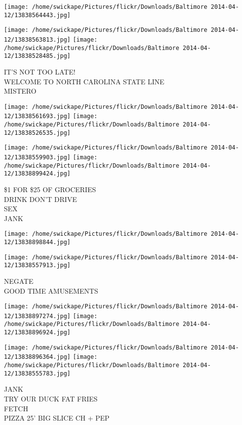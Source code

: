 \documentclass[10pt,letterpaper]{article}
\begin{document}
\texttt{[image: /home/swickape/Pictures/flickr/Downloads/Baltimore 2014-04-12/13838564443.jpg]}

\vspace{0.25in}
\texttt{[image: /home/swickape/Pictures/flickr/Downloads/Baltimore 2014-04-12/13838563813.jpg]}
\texttt{[image: /home/swickape/Pictures/flickr/Downloads/Baltimore 2014-04-12/13838528485.jpg]}

IT'S NOT TOO LATE!\\
WELCOME TO NORTH CAROLINA STATE LINE\\
MISTERO
\pagebreak

\texttt{[image: /home/swickape/Pictures/flickr/Downloads/Baltimore 2014-04-12/13838561693.jpg]}
\texttt{[image: /home/swickape/Pictures/flickr/Downloads/Baltimore 2014-04-12/13838526535.jpg]}

\texttt{[image: /home/swickape/Pictures/flickr/Downloads/Baltimore 2014-04-12/13838559903.jpg]}
\texttt{[image: /home/swickape/Pictures/flickr/Downloads/Baltimore 2014-04-12/13838899424.jpg]}

\$1 FOR \$25 OF GROCERIES\\
DRINK DON'T DRIVE\\
SEX\\
JANK
\pagebreak

\texttt{[image: /home/swickape/Pictures/flickr/Downloads/Baltimore 2014-04-12/13838898844.jpg]}

\vspace{0.25in}
\texttt{[image: /home/swickape/Pictures/flickr/Downloads/Baltimore 2014-04-12/13838557913.jpg]}

NEGATE\\
GOOD TIME AMUSEMENTS
\pagebreak

\texttt{[image: /home/swickape/Pictures/flickr/Downloads/Baltimore 2014-04-12/13838897274.jpg]}
\texttt{[image: /home/swickape/Pictures/flickr/Downloads/Baltimore 2014-04-12/13838896924.jpg]}

\texttt{[image: /home/swickape/Pictures/flickr/Downloads/Baltimore 2014-04-12/13838896364.jpg]}
\texttt{[image: /home/swickape/Pictures/flickr/Downloads/Baltimore 2014-04-12/13838555783.jpg]}

JANK\\
TRY OUR DUCK FAT FRIES\\
FETCH\\
PIZZA 25' BIG SLICE CH + PEP
\pagebreak
\end{document}
